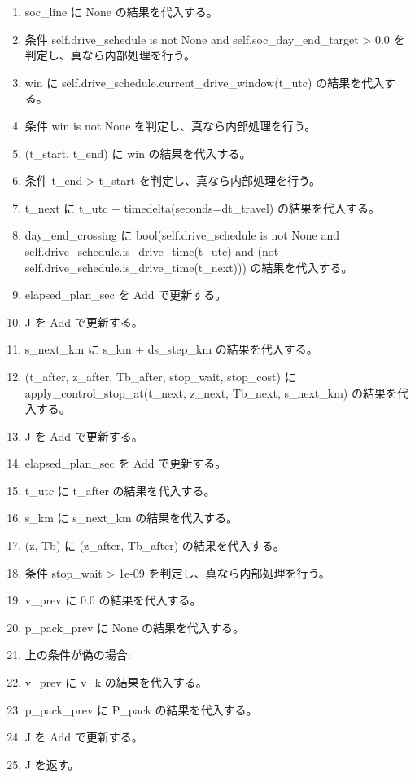\documentclass[a4paper,11pt]{article}
\begin{document}
\begin{enumerate}[leftmargin=1.8em]
\item   soc\_line に None の結果を代入する。
\item   条件 self.drive\_schedule is not None and self.soc\_day\_end\_target > 0.0 を判定し、真なら内部処理を行う。
\item     win に self.drive\_schedule.current\_drive\_window(t\_utc) の結果を代入する。
\item     条件 win is not None を判定し、真なら内部処理を行う。
\item       (t\_start, t\_end) に win の結果を代入する。
\item       条件 t\_end > t\_start を判定し、真なら内部処理を行う。
\item   t\_next に t\_utc + timedelta(seconds=dt\_travel) の結果を代入する。
\item   day\_end\_crossing に bool(self.drive\_schedule is not None and self.drive\_schedule.is\_drive\_time(t\_utc) and (not self.drive\_schedule.is\_drive\_time(t\_next))) の結果を代入する。
\item   elapsed\_plan\_sec を Add で更新する。
\item   J を Add で更新する。
\item   s\_next\_km に s\_km + ds\_step\_km の結果を代入する。
\item   (t\_after, z\_after, Tb\_after, stop\_wait, stop\_cost) に apply\_control\_stop\_at(t\_next, z\_next, Tb\_next, s\_next\_km) の結果を代入する。
\item   J を Add で更新する。
\item   elapsed\_plan\_sec を Add で更新する。
\item   t\_utc に t\_after の結果を代入する。
\item   s\_km に s\_next\_km の結果を代入する。
\item   (z, Tb) に (z\_after, Tb\_after) の結果を代入する。
\item   条件 stop\_wait > 1e-09 を判定し、真なら内部処理を行う。
\item     v\_prev に 0.0 の結果を代入する。
\item     p\_pack\_prev に None の結果を代入する。
\item     上の条件が偽の場合:
\item     v\_prev に v\_k の結果を代入する。
\item     p\_pack\_prev に P\_pack の結果を代入する。
\item J を Add で更新する。
\item J を返す。
            \end{enumerate}
\end{document}
